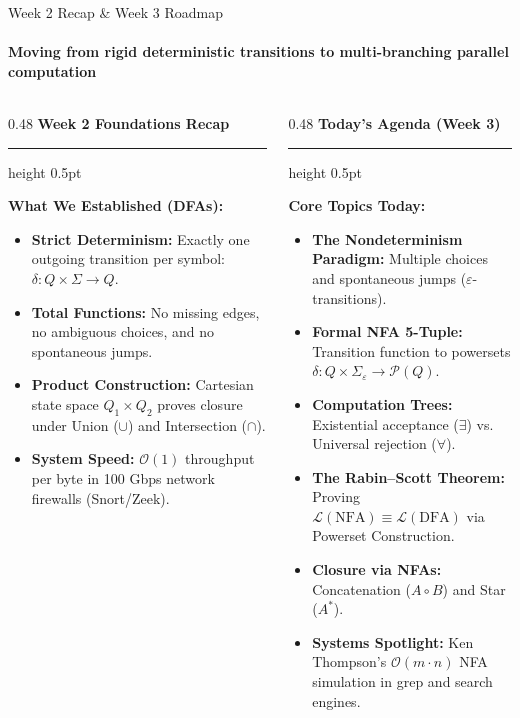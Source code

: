 \documentclass[aspectratio=169, 10pt]{beamer}
\newcommand{\colheader}[1]{%
  {\noindent\footnotesize\bfseries\color{gimpanavy}#1}%
  \vspace{0.02cm}%
  {\color{gimpanavy!30}\hrule height 0.5pt}%
  \vspace{0.05cm}%
}
\newcommand{\cardtitle}[1]{{\noindent\footnotesize\bfseries\color{gimpanavy}#1}\par\vspace{0.03cm}}
\begin{document}
\begin{frame}{Week 2 Recap \& Week 3 Roadmap}
  \framesubtitle{Moving from rigid deterministic transitions to multi-branching parallel computation}
  
  \begin{columns}[T]
    \begin{column}{0.48\textwidth}
      \colheader{Week 2 Foundations Recap}
      \begin{tcolorbox}[conceptcard]
        \cardtitle{What We Established (DFAs):}
        \begin{itemize}\setlength{\itemsep}{2pt}\scriptsize
          \item \textbf{Strict Determinism:} Exactly one outgoing transition per symbol: $\delta: Q \times \Sigma \to Q$.
          \item \textbf{Total Functions:} No missing edges, no ambiguous choices, and no spontaneous jumps.
          \item \textbf{Product Construction:} Cartesian state space $Q_1 \times Q_2$ proves closure under Union ($\cup$) and Intersection ($\cap$).
          \item \textbf{System Speed:} $\mathcal{O}(1)$ throughput per byte in 100 Gbps network firewalls (Snort/Zeek).
        \end{itemize}
      \end{tcolorbox}
    \end{column}
    
    \begin{column}{0.48\textwidth}
      \colheader{Today's Agenda (Week 3)}
      \begin{tcolorbox}[spotlightcard]
        \cardtitle{Core Topics Today:}
        \begin{itemize}\setlength{\itemsep}{1.8pt}\scriptsize
          \item \textbf{The Nondeterminism Paradigm:} Multiple choices and spontaneous jumps ($\varepsilon$-transitions).
          \item \textbf{Formal NFA 5-Tuple:} Transition function to powersets $\delta: Q \times \Sigma_\varepsilon \to \mathcal{P}(Q)$.
          \item \textbf{Computation Trees:} Existential acceptance ($\exists$) vs. Universal rejection ($\forall$).
          \item \textbf{The Rabin--Scott Theorem:} Proving $\mathcal{L}(\text{NFA}) \equiv \mathcal{L}(\text{DFA})$ via Powerset Construction.
          \item \textbf{Closure via NFAs:} Concatenation ($A \circ B$) and Star ($A^*$).
          \item \textbf{Systems Spotlight:} Ken Thompson's $\mathcal{O}(m \cdot n)$ NFA simulation in grep and search engines.
        \end{itemize}
      \end{tcolorbox}
    \end{column}
  \end{columns}
  

\end{frame}
\end{document}
